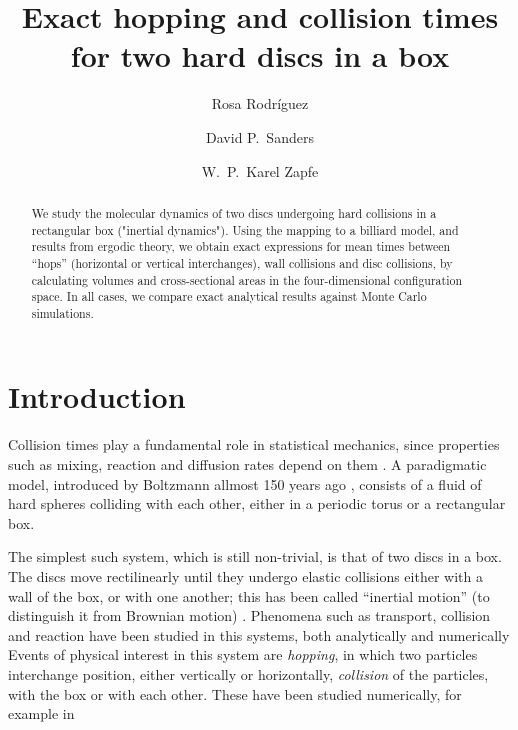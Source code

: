\documentclass[superscriptaddress,pre,reprint,showpacs,onecolumn]{revtex4-1}
\begin{document}
\title{Exact hopping and collision times for two hard discs in a box}

\author{Rosa Rodríguez}

\author{David P.~Sanders}

\author{W.~P.~Karel Zapfe}



\begin{abstract}
We study the molecular dynamics of two discs undergoing hard collisions in a rectangular box ("inertial dynamics").
Using the mapping to a billiard model, and results from ergodic theory, we obtain exact expressions for mean times between ``hops'' (horizontal or vertical interchanges), wall collisions and disc collisions, by calculating
volumes and cross-sectional areas in the four-dimensional configuration space.
In all cases, we compare exact analytical results against Monte Carlo simulations.
\end{abstract}

\maketitle



\section{Introduction}


Collision times play a fundamental role in statistical mechanics, since properties
such as mixing, reaction and diffusion rates depend on them \cite{Boltz72, Tolman, VanKampen}.
A paradigmatic model, introduced by Boltzmann allmost 150 years ago \cite{Boltz72, SzaszBook00},
consists of a fluid of hard spheres colliding with each other, either in a periodic torus or 
a rectangular box.

The simplest such system, which is still non-trivial, is that of two discs in a box.
The discs move rectilinearly until they undergo
elastic collisions either with a wall of the box, or with one another; this has been called ``inertial motion'' (to distinguish it from Brownian motion) \cite{Bowles04}.
Phenomena such as transport, collision and reaction
have been studied in this systems, both analytically 
 \cite{Awazu01, Munakata02, Suh05} and numerically \cite{MacElroy2005}
 Events of physical interest in this system are \emph{hopping},
in which two particles interchange position, either vertically or horizontally,
\emph{collision} of the particles, with the box or with each other.
These have been studied numerically, for example in \cite{MacElroy2004}
 
\end{document}
